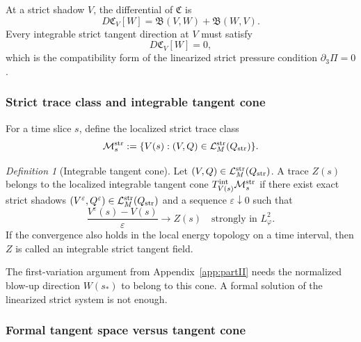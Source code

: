 \documentclass[11pt]{article}
\numberwithin{equation}{section}
\theoremstyle{plain}
\theoremstyle{definition}
\theoremstyle{remark}
\newtheorem{definition}{Definition}[section]
\newcommand{\eps}{\varepsilon}
\newcommand{\Mstr}{\mathcal M^{\rm str}}
\newcommand{\Lstr}{\mathcal L^{\rm str}}
\newcommand{\Tint}{T^{\rm int}}
\newcommand{\calB}{\mathfrak B}
\newcommand{\calC}{\mathfrak C}
\begin{document}
At a strict shadow \(V\), the differential of \(\calC\) is
\begin{equation}\label{pIII:eq:linearized-C}
        D\calC_V[W]
        =
        \calB(V,W)+\calB(W,V).
\end{equation}
Every integrable strict tangent direction at \(V\) must satisfy
\begin{equation}\label{pIII:eq:first-order-compatibility}
        D\calC_V[W]=0,
\end{equation}
which is the compatibility form of the linearized strict pressure condition
\(\partial_3\Pi=0\).

\subsubsection{Strict trace class and integrable tangent cone}

For a time slice \(s\), define the localized strict trace class
\begin{equation}\label{pIII:eq:strict-trace-class}
        \Mstr_s
        :=
        \{V(s):(V,Q)\in\Lstr_M(Q_{\rm str})\}.
\end{equation}

\begin{definition}[Integrable tangent cone]\label{pIII:def:int-tangent-cone}
Let \((V,Q)\in\Lstr_M(Q_{\rm str})\).  A trace \(Z(s)\) belongs to the localized
integrable tangent cone \(\Tint_{V(s)}\Mstr_s\) if there exist exact strict shadows
\((V^\eps,Q^\eps)\in\Lstr_M(Q_{\rm str})\) and a sequence \(\eps\downarrow0\) such that
\begin{equation}\label{pIII:eq:int-cone-def}
        \frac{V^\eps(s)-V(s)}{\eps}
        \longrightarrow
        Z(s)
        \quad\text{strongly in }L^2_\varphi .
\end{equation}
If the convergence also holds in the local energy topology on a time interval, then
\(Z\) is called an integrable strict tangent field.
\end{definition}

The first-variation argument from Appendix~\ref{app:partII} needs the normalized blow-up direction
\(W(s_*)\) to belong to this cone.  A formal solution of the linearized strict system is
not enough.

\subsubsection{Formal tangent space versus tangent cone}
\end{document}
